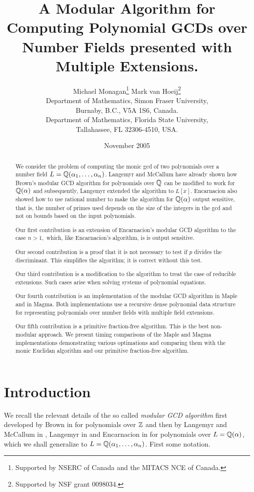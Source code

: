 \documentclass[10pt]{article}
\author{
  Michael Monagan\thanks{Supported by NSERC of Canada
  and the MITACS NCE of Canada.}\footnotemark[1] \quad
  Mark van Hoeij\thanks{Supported by NSF grant
  0098034.}\footnotemark[2] \\[10pt]
 \footnotemark[1]
  Department of Mathematics, Simon Fraser University, \\
  Burnaby, B.C., V5A 1S6, Canada. \\[10pt]
 \footnotemark[2]
  Department of Mathematics, Florida State University, \\
  Tallahassee, FL 32306-4510, USA.
}
\title{A Modular Algorithm for Computing
Polynomial GCDs over Number Fields presented with Multiple Extensions.}
\date{November 2005}
\begin{document}
\maketitle
\begin{abstract}
We consider the problem of computing the monic gcd of two
polynomials over a number field $L = {\mathbb Q}(\alpha_1,\ldots,\alpha_n)$.
Langemyr and McCallum have already shown how Brown's modular
GCD algorithm for polynomials over ${\mathbb Q}$ can be modified to work
for ${\mathbb Q}(\alpha)$ and subsequently, Langemyr extended the
algorithm to $L[x]$.  Encarnacion also showed how to use
rational number to make the algorithm for ${\mathbb Q}(\alpha)$ output sensitive,
that is, the number of primes used depends on the size of the integers
in the gcd and not on bounds based on the input polynomials.

Our first contribution is an extension of Encarnacion's modular GCD
algorithm to the case $n>1,$ which, like Encarnacion's algorithm,
is is output sensitive.

Our second contribution is a proof that it is not necessary
to test if $p$ divides the discriminant.
This simplifies the algorithm; it is correct without this test.

Our third contribution is a modification to the algorithm to treat
the case of reducible extensions.  Such cases arise when
solving systems of polynomial equations.



Our fourth contribution is an implementation of the
modular GCD algorithm in Maple and in Magma.
Both implementations use a recursive dense polynomial data structure for
representing polynomials over number fields with multiple field
extensions.

Our fifth contribution is a primitive fraction-free algorithm.
This is the best non-modular approach.
We present timing comparisons of the Maple and Magma implementations 
demonstrating various optimations and comparing them with the monic Euclidan
algorithm and our primitive fraction-free algorithm.

\end{abstract}

\section{Introduction}
We recall the relevant details of the so called {\em modular GCD algorithm}
first developed by Brown in \cite{Brown} for polynomials over ${\mathbb Z}$ and then
by Langemyr and McCallum in \cite{Langemyr}, Langemyr in \cite{AAECC} and
Encarnacion in \cite{Encarnacion} for polynomials over $L = {\mathbb Q}(\alpha)$,
which we shall generalize to $L = {\mathbb Q}(\alpha_1,\ldots,\alpha_n)$.
First some notation.
\end{document}
